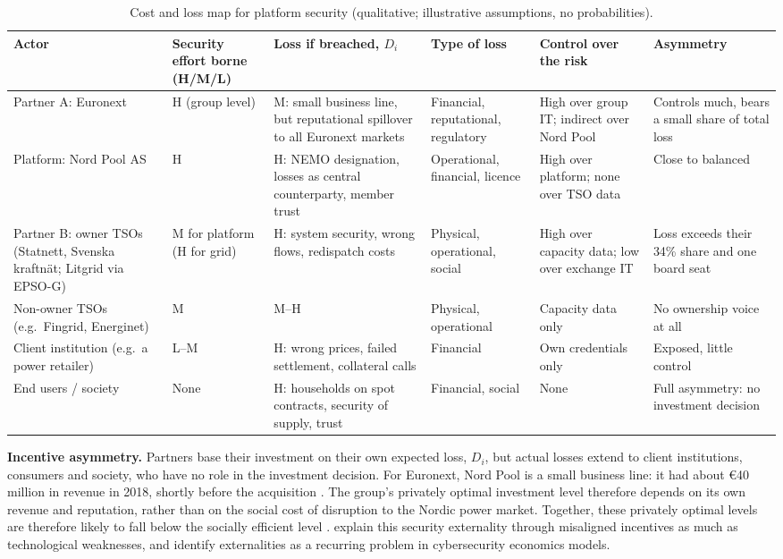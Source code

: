 \begin{table}[ht]
\centering
\small
\caption{Cost and loss map for platform security (qualitative; illustrative assumptions, no probabilities).}
\label{tab:cyber}
\setlength{\tabcolsep}{4pt}
\begin{tabularx}{\textwidth}{L{2.2cm} L{1.5cm} L{2.8cm} L{1.9cm} L{1.9cm} Y}
\toprule
\textbf{Actor} & \textbf{Security effort borne (H/M/L)} & \textbf{Loss if breached, $D_i$} & \textbf{Type of loss} & \textbf{Control over the risk} & \textbf{Asymmetry} \\
\midrule
Partner A: Euronext & H (group level) & M: small business line, but reputational spillover to all Euronext markets & Financial, reputational, regulatory & High over group IT; indirect over Nord Pool & Controls much, bears a small share of total loss \\
Platform: Nord Pool AS & H & H: NEMO designation, losses as central counterparty, member trust & Operational, financial, licence & High over platform; none over TSO data & Close to balanced \\
Partner B: owner TSOs (Statnett, Svenska kraftnät; Litgrid via EPSO-G) & M for platform (H for grid) & H: system security, wrong flows, redispatch costs & Physical, operational, social & High over capacity data; low over exchange IT & Loss exceeds their 34\% share and one board seat \\
Non-owner TSOs (e.g.\ Fingrid, Energinet) & M & M--H & Physical, operational & Capacity data only & No ownership voice at all \\
Client institution (e.g.\ a power retailer) & L--M & H: wrong prices, failed settlement, collateral calls & Financial & Own credentials only & Exposed, little control \\
End users / society & None & H: households on spot contracts, security of supply, trust & Financial, social & None & Full asymmetry: no investment decision \\
\bottomrule
\end{tabularx}
\end{table}

\textbf{Incentive asymmetry.} Partners base their investment on their own expected loss, $D_i$, but actual losses extend to client institutions, consumers and society, who have no role in the investment decision. For Euronext, Nord Pool is a small business line: it had about €40 million in revenue in 2018, shortly before the acquisition \citep{Euronext2020}. The group's privately optimal investment level therefore depends on its own revenue and reputation, rather than on the social cost of disruption to the Nordic power market. Together, these privately optimal levels are therefore likely to fall below the socially efficient level \citep{AndersonMoore2006}. \citet{AndersonMoore2006} explain this security externality through misaligned incentives as much as technological weaknesses, and \citet{Kianpour2021} identify externalities as a recurring problem in cybersecurity economics models.

